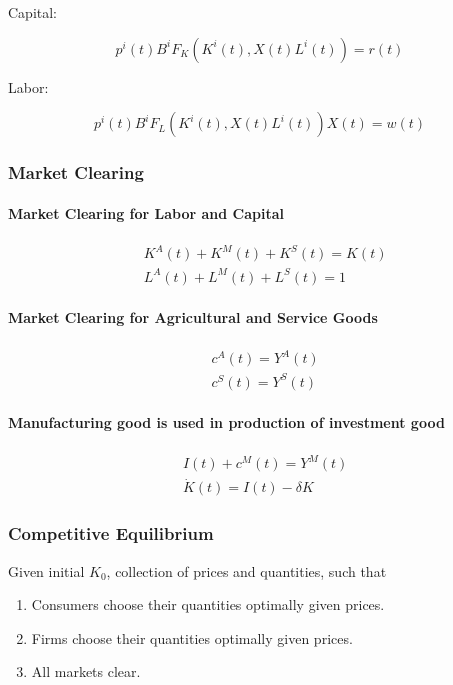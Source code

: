 \documentclass[10pt]{article}
\begin{document}
Capital:

$$
p^i(t) B^i F_K\left(K^i(t), X(t) L^i(t)\right)=r(t)
$$

Labor:

$$
p^i(t) B^i F_L\left(K^i(t), X(t) L^i(t)\right) X(t)=w(t)
$$


\subsubsection{Market Clearing}

\paragraph{Market Clearing for Labor and Capital}

\begin{align}
    &K^A(t)+K^M(t)+K^S(t)=K(t) \\
    &L^A(t)+L^M(t)+L^S(t)=1
\end{align}

\paragraph{Market Clearing for Agricultural and Service Goods}

\begin{align}
    &c^A(t)=Y^A(t) \\
    &c^S(t)=Y^S(t)
\end{align}

\paragraph{Manufacturing good is used in production of investment good}

\begin{align}
    &I(t)+c^M(t) =Y^M(t) \\ 
    &\dot{K}(t) =I(t)-\delta K
\end{align}

\subsubsection{Competitive Equilibrium}

Given initial $K_0$, collection of prices and quantities, such that
\begin{enumerate}
    \item Consumers choose their quantities optimally given prices.
    \item Firms choose their quantities optimally given prices.
    \item All markets clear.
\end{enumerate}
\end{document}
